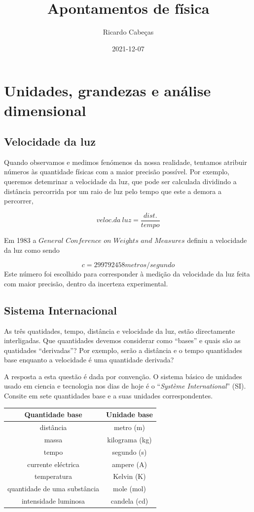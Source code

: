 \documentclass[
  portuguese,
  ]{book}
\title{Apontamentos de física}
\author{Ricardo Cabeças}
\date{2021-12-07}
\begin{document}
\maketitle

{
\setcounter{tocdepth}{1}
\tableofcontents
}
\hypertarget{unidades-grandezas-e-anuxe1lise-dimensional}{%
\chapter{Unidades, grandezas e análise dimensional}\label{unidades-grandezas-e-anuxe1lise-dimensional}}

\hypertarget{velocidade-da-luz}{%
\section{Velocidade da luz}\label{velocidade-da-luz}}

Quando observamos e medimos fenómenos da nossa realidade, tentamos atribuir números às quantidade físicas com a maior precisão possível. Por exemplo, queremos detemrinar a velocidade da luz, que pode ser calculada dividindo a distância percorrida por um raio de luz pelo tempo que este a demora a percorrer,

\[veloc.da\ luz=\frac{dist.}{tempo}\]

Em 1983 a \(\textit{General Conference on Weights and Measures}\) definiu a velocidade da luz como sendo

\[c=299792458metros/segundo\]
Este número foi escolhido para corresponder à medição da velocidade da luz feita com maior precisão, dentro da incerteza experimental.

\hypertarget{sistema-internacional}{%
\section{Sistema Internacional}\label{sistema-internacional}}

As três quatidades, tempo, distância e velocidade da luz, estão directamente interligadas. Que quantidades devemos considerar como ``bases'' e quais são as quatidades ``derivadas''? Por exemplo, serão a distância e o tempo quantidades base enquanto a velocidade é uma quantidade derivada?

A resposta a esta questão é dada por convenção. O sistema básico de unidades usado em ciencia e tecnologia nos dias de hoje é o ``\emph{Système International}'' (SI). Consite em sete quantidades base e a suas unidades correspondentes.

\begin{longtable}[]{@{}cc@{}}
\toprule
Quantidade base & Unidade base\tabularnewline
\midrule
\endhead
distância & metro (m)\tabularnewline
massa & kilograma (kg)\tabularnewline
tempo & segundo (s)\tabularnewline
currente eléctrica & ampere (A)\tabularnewline
temperatura & Kelvin (K)\tabularnewline
quantidade de uma substância & mole (mol)\tabularnewline
intensidade luminosa & candela (cd)\tabularnewline
\bottomrule
\end{longtable}
\end{document}
